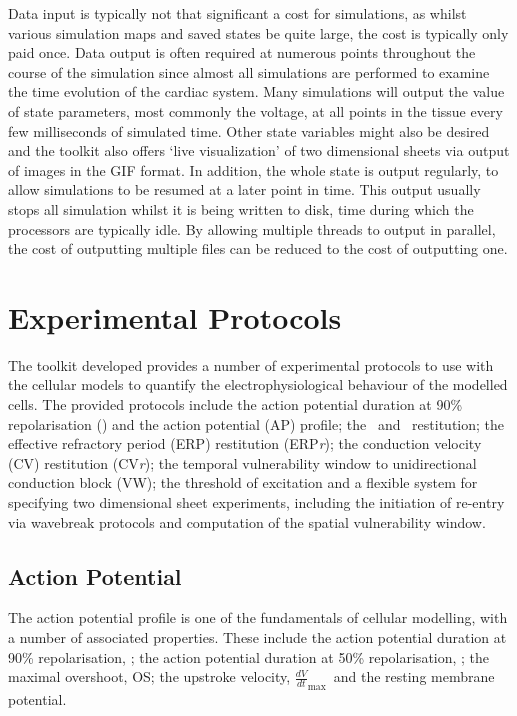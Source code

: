 Data input is typically not that significant a cost for
simulations, as whilst various simulation maps and saved states be quite large,
the cost is typically only paid once.  Data output is often required at numerous
points throughout the course of the simulation since almost all simulations are
performed to examine the time evolution of the cardiac system.  Many simulations
will output the value of state parameters, most commonly the voltage, at all
points in the tissue every few milliseconds of simulated time.  Other state
variables might also be desired and the toolkit also offers `live visualization'
of two dimensional sheets via output of images in the GIF format.  In addition,
the whole state is output regularly, to allow simulations to be resumed at a
later point in time.  This output usually stops all simulation whilst it is
being written to disk, time during which the processors are typically idle.  By
allowing multiple threads to output in parallel, the cost of outputting multiple
files can be reduced to the cost of outputting one.


\section{Experimental Protocols}

The toolkit developed provides a number of experimental protocols to use with
the cellular models to quantify the electrophysiological behaviour of the
modelled cells.  The provided protocols include the action potential duration at
90\% repolarisation (\apd) and the action potential (AP) profile; the \apdr\ and
\apdr[50]\ restitution; the effective refractory period (ERP) restitution
(ERP\emph{r}); the conduction velocity (CV) restitution (CV\emph{r}); the
temporal vulnerability window to unidirectional conduction block (VW); the
threshold of excitation and a flexible system for specifying two dimensional
sheet experiments, including the initiation of re-entry via wavebreak protocols
and computation of the spatial vulnerability window.

\subsection{Action Potential}

The action potential profile is one of the fundamentals of cellular modelling,
with a number of associated properties.  These include the action potential
duration at 90\% repolarisation, \apd; the action potential
duration at 50\% repolarisation, \apd[50]; the maximal overshoot, OS; the
upstroke velocity, $\frac{dV}{dt}_{\text{max}}$\ and the resting membrane
potential.

